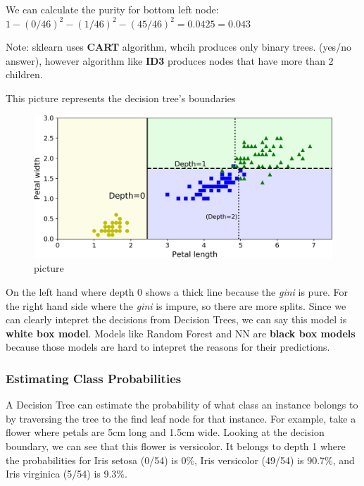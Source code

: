 \documentclass[
  letterpaper,
  DIV=11,
  numbers=noendperiod]{scrartcl}
\begin{document}
We can calculate the purity for bottom left node:
\(1-(0/46)^2 - (1/46)^2 - (45/46)^2 = 0.0425 = 0.043\)

Note: sklearn uses \textbf{CART} algorithm, whcih produces only binary
trees. (yes/no answer), however algorithm like \textbf{ID3} produces
nodes that have more than 2 children.

This picture represents the decision tree's boundaries

\begin{figure}[H]

{\centering \includegraphics{13.png}

}

\caption{picture}

\end{figure}%

On the left hand where depth 0 shows a thick line because the
\emph{gini} is pure. For the right hand side where the \emph{gini} is
impure, so there are more splits. Since we can clearly intepret the
decisions from Decision Trees, we can say this model is \textbf{white
box model}. Models like Random Forest and NN are \textbf{black box
models} because those models are hard to intepret the reasons for their
predictions.

\subsubsection{Estimating Class
Probabilities}\label{estimating-class-probabilities}

A Decision Tree can estimate the probability of what class an instance
belongs to by traversing the tree to the find leaf node for that
instance. For example, take a flower where petals are 5cm long and 1.5cm
wide. Looking at the decision boundary, we can see that this flower is
versicolor. It belongs to depth 1 where the probabilities for Iris
setosa (0/54) is 0\%, Iris versicolor (49/54) is 90.7\%, and Iris
virginica (5/54) is 9.3\%.
\end{document}
